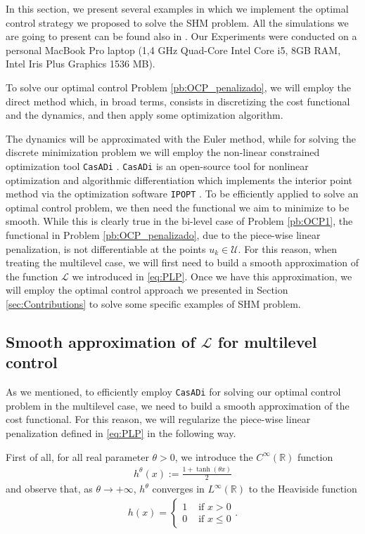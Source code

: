 \documentclass[9pt,shortpaper,twoside,web]{ieeecolor}
\begin{document}
In this section, we present several examples in which we implement the optimal control strategy we proposed to solve the SHM problem. All the simulations we are going to present can be found also in \cite{simus}. Our Experiments were conducted on a personal MacBook Pro laptop (1,4 GHz Quad-Core Intel Core i5, 8GB RAM, Intel Iris Plus Graphics 1536 MB). 

To solve our optimal control Problem \ref{pb:OCP_penalizado}, we will employ the direct method \cite{rao2009survey} which, in broad terms, consists in discretizing the cost functional and the dynamics, and then apply some optimization algorithm. 

The dynamics will be approximated with the Euler method, while for solving the discrete minimization problem we will employ the non-linear constrained optimization tool \texttt{CasADi} \cite{Andersson2019}. \texttt{CasADi} is an open-source tool for nonlinear optimization and algorithmic differentiation which implements the interior point method via the optimization software \texttt{IPOPT} \cite{wachter2006implementation}. To be efficiently applied to solve an optimal control problem, we then need the functional we aim to minimize to be smooth. While this is clearly true in the bi-level case of Problem \ref{pb:OCP1}, the functional in Problem \ref{pb:OCP_penalizado}, due to the piece-wise linear penalization, is not differentiable at the points $u_k\in\mathcal U$. For this reason, when treating the multilevel case, we will first need to build a smooth approximation of the  function $\mathcal L$ we introduced in \eqref{eq:PLP}. Once we have this approximation, we will employ the optimal control approach we presented in Section \ref{sec:Contributions} to solve some specific examples of SHM problem.

\subsection{Smooth approximation of $\mathcal L$ for multilevel control}

As we mentioned, to efficiently employ \texttt{CasADi} for solving our optimal control problem in the multilevel case, we need to build a smooth approximation of the cost functional. For this reason, we will regularize the piece-wise linear penalization defined in \eqref{eq:PLP} in the following way.

First of all, for all real parameter $\theta>0$, we introduce the $C^\infty(\mathbb{R})$ function
\begin{align*}
	\displaystyle h^\theta(x) := \frac{1 + \tanh(\theta x)}{2}
\end{align*}
and observe that, as $\theta\to +\infty$, $h^\theta$ converges in $L^\infty(\mathbb{R})$ to the Heaviside function 
\begin{align*}
	h(x) = \begin{cases}
		1 & \text{ if } x > 0 
		\\
		0 & \text{ if } x \leq 0
	\end{cases}.
\end{align*}
\end{document}
